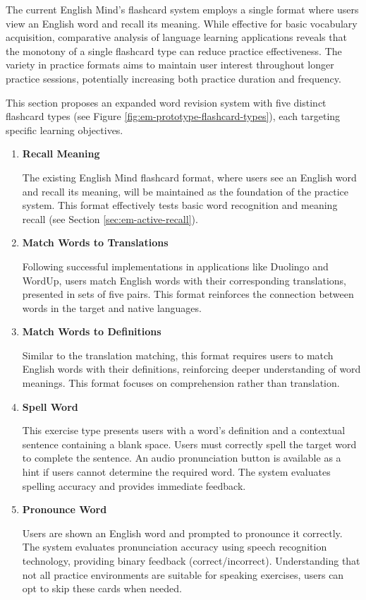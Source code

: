The current English Mind's flashcard system employs a single format where users view an English word and recall its meaning. While effective for basic vocabulary acquisition, comparative analysis of language learning applications reveals that the monotony of a single flashcard type can reduce practice effectiveness. The variety in practice formats aims to maintain user interest throughout longer practice sessions, potentially increasing both practice duration and frequency.

This section proposes an expanded word revision system with five distinct flashcard types (see Figure \ref{fig:em-prototype-flashcard-types}), each targeting specific learning objectives.

\begin{enumerate}
    \item \textbf{Recall Meaning}

    The existing English Mind flashcard format, where users see an English word and recall its meaning, will be maintained as the foundation of the practice system. This format effectively tests basic word recognition and meaning recall (see Section \ref{sec:em-active-recall}).

    \item \textbf{Match Words to Translations}
    
    Following successful implementations in applications like Duolingo and WordUp, users match English words with their corresponding translations, presented in sets of five pairs. This format reinforces the connection between words in the target and native languages.

    \item \textbf{Match Words to Definitions}
    
    Similar to the translation matching, this format requires users to match English words with their definitions, reinforcing deeper understanding of word meanings. This format focuses on comprehension rather than translation.

    \item \textbf{Spell Word}
    
    This exercise type presents users with a word's definition and a contextual sentence containing a blank space. Users must correctly spell the target word to complete the sentence. An audio pronunciation button is available as a hint if users cannot determine the required word. The system evaluates spelling accuracy and provides immediate feedback.

    \item \textbf{Pronounce Word}

    Users are shown an English word and prompted to pronounce it correctly. The system evaluates pronunciation accuracy using speech recognition technology, providing binary feedback (correct/incorrect). Understanding that not all practice environments are suitable for speaking exercises, users can opt to skip these cards when needed.

\end{enumerate}
